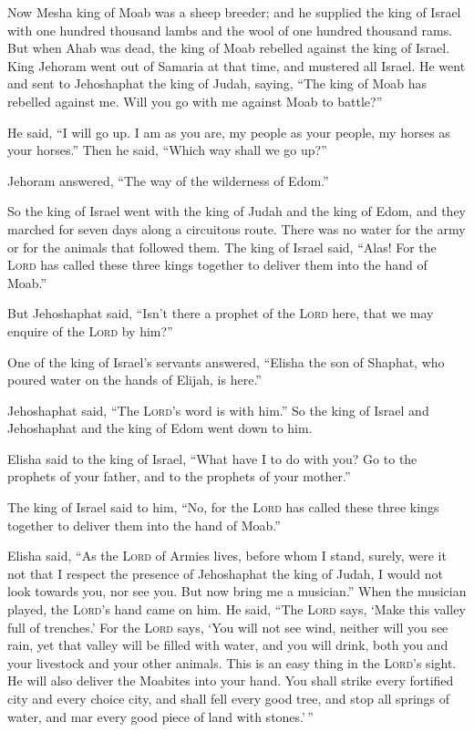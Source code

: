  Now Mesha king of Moab was a sheep breeder; and he
supplied the king of Israel with one hundred thousand lambs and the wool
of one hundred thousand rams.  But when Ahab was dead, the
king of Moab rebelled against the king of Israel.  King
Jehoram went out of Samaria at that time, and mustered all Israel.
 He went and sent to Jehoshaphat the king of Judah,
saying, ``The king of Moab has rebelled against me. Will you go with me
against Moab to battle?''

He said, ``I will go up. I am as you are, my people as your people, my
horses as your horses.''  Then he said, ``Which way shall
we go up?''

Jehoram answered, ``The way of the wilderness of Edom.''

 So the king of Israel went with the king of Judah and the
king of Edom, and they marched for seven days along a circuitous route.
There was no water for the army or for the animals that followed them.
 The king of Israel said, ``Alas! For the \textsc{Lord}
has called these three kings together to deliver them into the hand of
Moab.''

 But Jehoshaphat said, ``Isn't there a prophet of the
\textsc{Lord} here, that we may enquire of the \textsc{Lord} by him?''

One of the king of Israel's servants answered, ``Elisha the son of
Shaphat, who poured water on the hands of Elijah, is here.''

 Jehoshaphat said, ``The \textsc{Lord}'s word is with
him.'' So the king of Israel and Jehoshaphat and the king of Edom went
down to him.

 Elisha said to the king of Israel, ``What have I to do
with you? Go to the prophets of your father, and to the prophets of your
mother.''

The king of Israel said to him, ``No, for the \textsc{Lord} has called
these three kings together to deliver them into the hand of Moab.''

 Elisha said, ``As the \textsc{Lord} of Armies lives,
before whom I stand, surely, were it not that I respect the presence of
Jehoshaphat the king of Judah, I would not look towards you, nor see
you.  But now bring me a musician.'' When the musician
played, the \textsc{Lord}'s hand came on him.  He said,
``The \textsc{Lord} says, `Make this valley full of trenches.'
 For the \textsc{Lord} says, `You will not see wind,
neither will you see rain, yet that valley will be filled with water,
and you will drink, both you and your livestock and your other animals.
 This is an easy thing in the \textsc{Lord}'s sight. He
will also deliver the Moabites into your hand.  You shall
strike every fortified city and every choice city, and shall fell every
good tree, and stop all springs of water, and mar every good piece of
land with stones.'\,''

